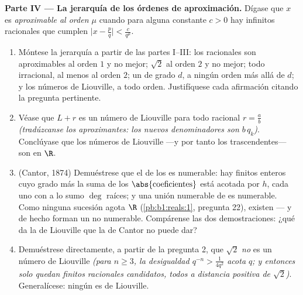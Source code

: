 \begin{problem}
\medskip
\noindent\textbf{Parte IV --- La jerarquía de los órdenes de
aproximación.} Dígase que $x$ es \emph{aproximable al orden $\mu$}
cuando para alguna constante $c > 0$ hay infinitos racionales que
cumplen $\bigl|x - \frac pq\bigr| < \frac{c}{q^{\mu}}$.
\begin{enumerate}[resume]
  \item Móntese la jerarquía a partir de las partes I--III: los
        racionales son aproximables al orden $1$ y no mejor; $\sqrt 2$
        al orden $2$ y no mejor; todo irracional, al menos al orden
        $2$; un  de grado $d$, a ningún orden más
        allá de $d$; y los números de Liouville, a todo orden.
        Justifíquese cada afirmación citando la pregunta pertinente.
  \item Véase que $L + r$ es un número de Liouville para todo
        racional $r = \frac ab$ \emph{(tradúzcanse los aproximantes:
        los nuevos denominadores son $b\,q_k$)}. Conclúyase que los
        números de Liouville ---y por tanto los trascendentes--- son
         en $\R$.
  \item (Cantor, 1874) Demuéstrese que el  de los
         es numerable: hay finitos 
        enteros cuyo grado más la suma de los
        $\abs{\text{coeficientes}}$ está acotada por $h$, cada uno con
        a lo sumo $\deg$ raíces; y una unión numerable de
         es numerable. Como ninguna sucesión agota
        $\R$ (\cref{pb:b1:reals:1}, pregunta 22), existen  --- y de hecho forman un  no numerable.
        Compárense las dos demostraciones: ¿qué da la de Liouville que
        la de Cantor no puede dar?
  \item Demuéstrese directamente, a partir de la pregunta 2, que
        $\sqrt 2$ \emph{no} es un número de Liouville \emph{(para
        $n \geq 3$, la desigualdad $q^{-n} > \frac{1}{4q^2}$ acota
        $q$; y entonces solo quedan finitos racionales candidatos,
        todos a distancia positiva de $\sqrt2$)}. Generalícese:
        ningún  es de Liouville.
\end{enumerate}


\end{problem}
